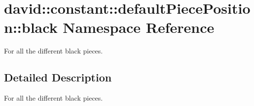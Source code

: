 \hypertarget{namespacedavid_1_1constant_1_1defaultPiecePosition_1_1black}{}\section{david\+:\+:constant\+:\+:default\+Piece\+Position\+:\+:black Namespace Reference}
\label{namespacedavid_1_1constant_1_1defaultPiecePosition_1_1black}


For all the different black pieces.  




\subsection{Detailed Description}
For all the different black pieces. 